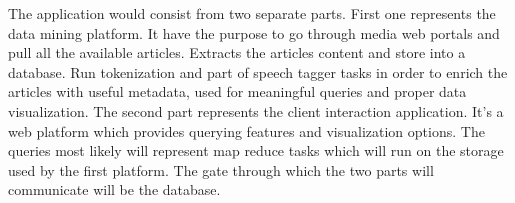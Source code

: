 The application would consist from two separate parts. First one represents the data mining platform. It have the purpose to go through media web portals and pull all the available articles. Extracts the articles content and store into a database. Run tokenization and part of speech tagger tasks in order to enrich the articles with useful metadata, used for meaningful queries and proper data visualization. The second part represents the client interaction application. It's a web platform which provides querying features and visualization options. The queries most likely will represent map reduce tasks which will run on the storage used by the first platform. The gate through which the two parts will communicate will be the database.

\clearpage